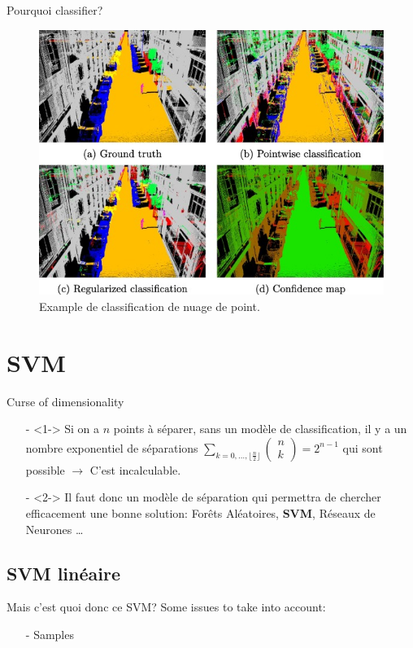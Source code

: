\documentclass[9pt]{beamer}
\begin{document}
	\begin{frame}{Pourquoi classifier?}
		\begin{figure}[H]
			\includegraphics[width=.7\textwidth]{pc_classification}
			\caption{\label{fig::pc_classif}Example de classification de nuage de point\cite{LANDRIEU2017102}.}
		\end{figure}
	\end{frame}

	\section[SVM]{SVM}
	\begin{frame}{Curse of dimensionality}
		\begin{itemize}
			\item[-]<1-> Si on a $n$ points à séparer, sans un modèle de classification, il y a un nombre exponentiel de séparations $\sum_{k=0,\dots,\lfloor \frac{n}{2} \rfloor} \begin{pmatrix}
			n\\
			k
			\end{pmatrix} = 2^{n-1}$ qui sont possible $\longrightarrow$ C'est incalculable.
			\item[-]<2-> Il faut donc un modèle de séparation qui permettra de chercher efficacement une bonne solution: Forêts Aléatoires, \textbf{SVM}, Réseaux de Neurones \dots
		\end{itemize}
	\end{frame}
	\subsection[linear]{SVM linéaire}
	\begin{frame}{Mais c'est quoi donc ce SVM?}
		Some issues to take into account:
		\begin{itemize}
			\item[-] Samples
		\end{itemize}
	\end{frame}
\end{document}
